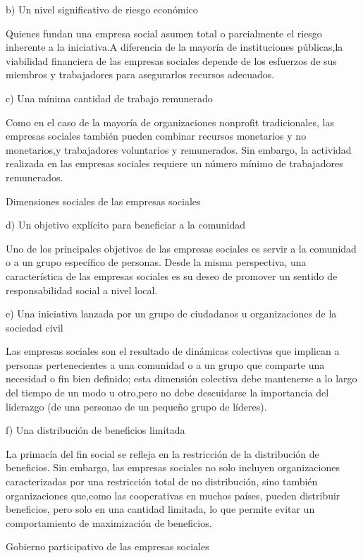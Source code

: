 \documentclass{memoir}
\begin{document}
b)  Un  nivel significativo de  riesgo económico 

Quienes fundan una   empresa social asumen total o parcialmente el  riesgo inherente a la iniciativa.A diferencia de  la mayoría de   instituciones públicas,la viabilidad financiera de  las  empresas sociales  depende de  los  esfuerzos de  sus   miembros y  trabajadores para asegurarlos  recursos adecuados.

c)  Una mínima cantidad de  trabajo remunerado

Como en  el  caso de  la mayoría de  organizaciones nonprofit tradicionales, las  empresas sociales también pueden combinar recursos monetarios y no  monetarios,y trabajadores voluntarios y remunerados. Sin  embargo, la actividad realizada en  las  empresas sociales requiere un  número mínimo de trabajadores remunerados. 


Dimensiones sociales de las empresas sociales

d)  Un  objetivo explícito para beneficiar a la comunidad 

Uno de  los  principales objetivos de  las  empresas sociales es  servir a la comunidad o a un  grupo específico de  personas. Desde la misma perspectiva, una   característica de  las  empresas sociales es  su  deseo de  promover un  sentido de  responsabilidad social a nivel local.

e)  Una iniciativa lanzada por   un  grupo de  ciudadanos u organizaciones de  la sociedad civil

Las   empresas sociales son   el  resultado de  dinámicas colectivas que   implican a personas pertenecientes a una   comunidad o a un  grupo que   comparte una   necesidad o fin bien definido; esta dimensión colectiva debe mantenerse a lo largo del   tiempo de  un  modo u otro,pero no  debe descuidarse la importancia del   liderazgo (de  una   personao de  un  pequeño grupo de  líderes).

f) Una distribución de  beneficios limitada

La  primacía del   fin  social se  refleja en  la restricción de  la distribución de  beneficios. Sin  embargo, las  empresas sociales no  solo incluyen organizaciones caracterizadas por   una   restricción total de  no distribución, sino también organizaciones que,como las  cooperativas en  muchos países, pueden distribuir beneficios, pero solo en una cantidad limitada, lo que   permite evitar un  comportamiento de  maximización de  beneficios.


Gobierno participativo de las empresas sociales
\end{document}
